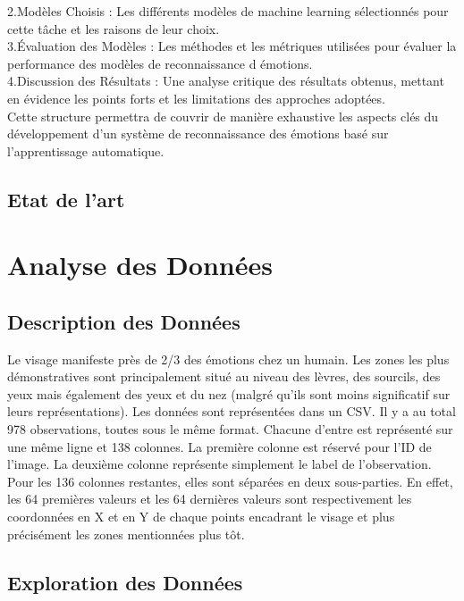 \documentclass{rapport}
\begin{document}
2.Modèles Choisis :
Les différents modèles de machine learning sélectionnés pour cette tâche et les raisons de leur choix.\\

3.Évaluation des Modèles :
Les méthodes et les métriques utilisées pour évaluer la performance des modèles de reconnaissance d émotions.\\

4.Discussion des Résultats :
Une analyse critique des résultats obtenus,
mettant en évidence les points forts et les limitations des approches adoptées.\\

Cette structure permettra de couvrir de manière exhaustive les aspects clés du développement
d'un système de reconnaissance des émotions basé sur l'apprentissage automatique.

\subsection{Etat de l'art}

\section{Analyse des Données}
\subsection{Description des Données}

Le visage manifeste près de 2/3 des émotions chez un humain. \cite{koBriefReviewFacial2018}
Les zones les plus démonstratives sont
principalement situé au niveau des lèvres, des sourcils, des yeux mais
également des yeux et du nez (malgré qu'ils sont moins significatif sur leurs
représentations). \cite{koBriefReviewFacial2018} Les données sont représentées dans
un CSV. Il y a au total 978 observations, toutes sous le même format. Chacune
d'entre est représenté sur une même ligne et 138 colonnes. La première colonne
est réservé pour l'ID de l'image. La deuxième colonne représente simplement le
label de l'observation. Pour les 136 colonnes restantes, elles sont séparées
en deux sous-parties. En effet, les 64 premières valeurs et les 64 dernières
valeurs sont respectivement les coordonnées en X et en Y de chaque points
encadrant le visage et plus précisément les zones mentionnées plus tôt.

\subsection{Exploration des Données}
\end{document}
